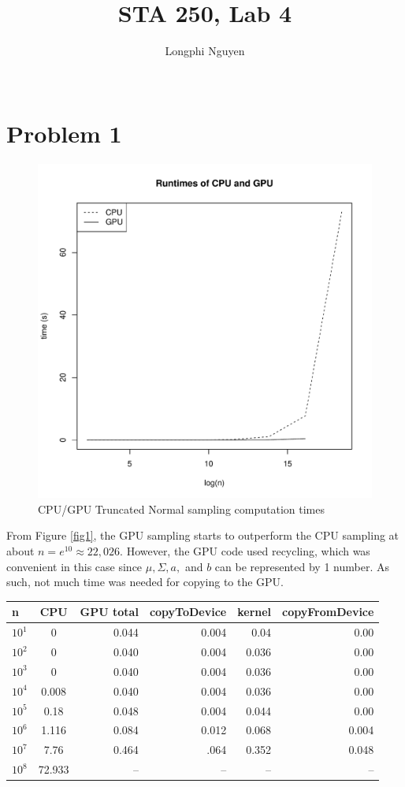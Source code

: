 \documentclass{article}
\title{STA 250, Lab 4}
\author{Longphi Nguyen\\ \\}
\begin{document}
\maketitle
\section{Problem 1}

\begin{figure}
\center
\includegraphics[width=.6\textwidth]{Q1Plot.pdf}
\caption{CPU/GPU Truncated Normal sampling computation times}
\label{fig1}
\end{figure}

From Figure \eqref{fig1}, the GPU sampling starts to outperform the CPU sampling at about $n=e^{10}\approx 22,026.$ However, the GPU code used recycling, which was convenient in this case since $\mu, \Sigma, a,$ and $b$ can be represented by 1 number. As such, not much time was needed for copying to the GPU.

\begin{center}
  \begin{tabular}{ |l | c |r| rrr| }
    \hline
n & CPU & GPU total & copyToDevice & kernel & copyFromDevice\\
\hline
$10^1$ & 0 & 0.044 & 0.004 & 0.04 & 0.00 \\
$10^2$ & 0 & 0.040 & 0.004 & 0.036 & 0.00 \\
$10^3$ & 0 & 0.040 & 0.004 & 0.036 & 0.00 \\
$10^4$ & 0.008 & 0.040 & 0.004 & 0.036 & 0.00 \\
$10^5$ & 0.18 & 0.048 & 0.004 & 0.044 & 0.00 \\
$10^6$ & 1.116 & 0.084 & 0.012 & 0.068 & 0.004 \\
$10^7$ & 7.76 & 0.464 & .064 & 0.352 & 0.048 \\
$10^8$ & 72.933 & -- & -- & -- & --\\
    \hline
  \end{tabular}
\end{center}
\end{document}
